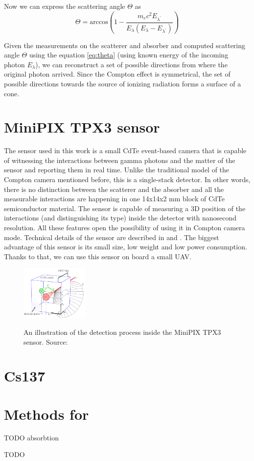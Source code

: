 Now we can express the scattering angle $\Theta$ as
\begin{equation}
    \Theta = \mathrm{arccos} \left (  1-\frac{m_{e}c^{2}E_{\lambda^{\prime}}}{E_{\lambda} (E_{\lambda} - E_{\lambda^{\prime}})} \right )
    \label{eq:theta}
\end{equation}

Given the measurements on the scatterer and absorber and computed scattering angle $\Theta$ using the equation \ref{eq:theta} (using known energy of the incoming photon $E_{\lambda}$), we can reconstruct a set of possible directions from where the original photon arrived. Since the Compton effect is symmetrical, the set of possible directions towards the source of ionizing radiation forms a surface of a cone.



\section{MiniPIX TPX3 sensor}
The sensor used in this work is a small CdTe event-based camera that is capable of witnessing the interactions between gamma photons and the matter of the sensor and reporting them in real time.
Unlike the traditional model of the Compton camera mentioned before, this is a single-stack detector.
In other words, there is no distinction between the scatterer and the absorber and all the measurable interactions are happening in one 14x14x2 mm block of CdTe semiconductor material.
The sensor is capable of measuring a 3D position of the interactions (and distinguishing its type) inside the detector with nanosecond resolution. 
All these features open the possibility of using it in Compton camera mode.
Technical details of the sensor are described in \cite{baca2021gamma} and \cite{baca2019timepix}.
The biggest advantage of this sensor is its small size, low weight and low power consumption.
Thanks to that, we can use this sensor on board a small UAV. 


\begin{figure}[!h]
    \centering
    \includegraphics[width=0.3\textwidth]{./fig/photos/minipix.png}
    \label{fig:minipix}
    \caption{An illustration of the detection process inside the MiniPIX TPX3 sensor. Source: \cite{baca2021gamma}}
\end{figure}

\section{Cs137}
\section{Methods for} 


TODO
absorbtion

TODO

